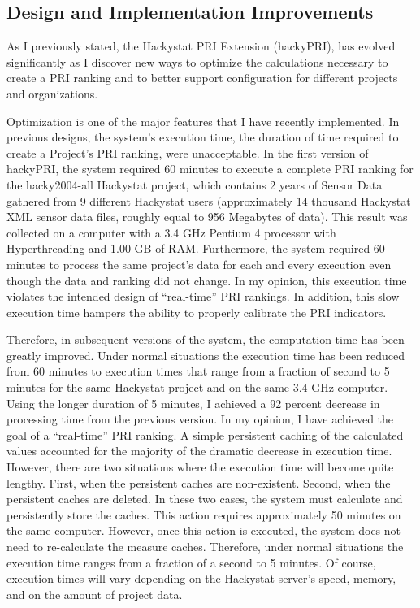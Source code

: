 \subsection{Design and Implementation Improvements}
As I previously stated, the Hackystat PRI Extension (hackyPRI), has evolved
significantly as I discover new ways to optimize the calculations necessary
to create a PRI ranking and to better support configuration for different
projects and organizations.

Optimization is one of the major features that I have recently implemented.
In previous designs, the system's execution time, the duration of time
required to create a Project's PRI ranking, were unacceptable. In the first
version of hackyPRI, the system required 60 minutes to execute a complete
PRI ranking for the hacky2004-all Hackystat project, which contains 2 years
of Sensor Data gathered from 9 different Hackystat users (approximately 14
thousand Hackystat XML sensor data files, roughly equal to 956 Megabytes of
data). This result was collected on a computer with a 3.4 GHz Pentium 4
processor with Hyperthreading and 1.00 GB of RAM. Furthermore, the system
required 60 minutes to process the same project's data for each and every
execution even though the data and ranking did not change. In my opinion,
this execution time violates the intended design of ``real-time'' PRI
rankings. In addition, this slow execution time hampers the ability to
properly calibrate the PRI indicators.

Therefore, in subsequent versions of the system, the computation time has
been greatly improved. Under normal situations the execution time has been
reduced from 60 minutes to execution times that range from a fraction of
second to 5 minutes for the same Hackystat project and on the same 3.4 GHz
computer. Using the longer duration of 5 minutes, I achieved a 92 percent
decrease in processing time from the previous version. In my opinion, I
have achieved the goal of a ``real-time'' PRI ranking. A simple persistent
caching of the calculated values accounted for the majority of the dramatic
decrease in execution time. However, there are two situations where the
execution time will become quite lengthy.  First, when the persistent
caches are non-existent.  Second, when the persistent caches are deleted.
In these two cases, the system must calculate and persistently store the
caches. This action requires approximately 50 minutes on the same computer.
However, once this action is executed, the system does not need to
re-calculate the measure caches. Therefore, under normal situations the
execution time ranges from a fraction of a second to 5 minutes. Of course,
execution times will vary depending on the Hackystat server's speed,
memory, and on the amount of project data.


